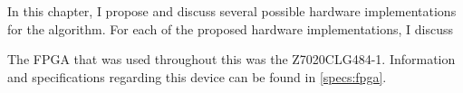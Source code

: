 In this chapter, I propose and discuss several possible hardware implementations
for the  algorithm. For each of
the proposed hardware implementations, I discuss

The \gls{FPGA} that was used throughout this \thesis{} was the \Xilinx{}
Z7020CLG484-1. Information and specifications regarding this device can be found
in \autoref{specs:fpga}.